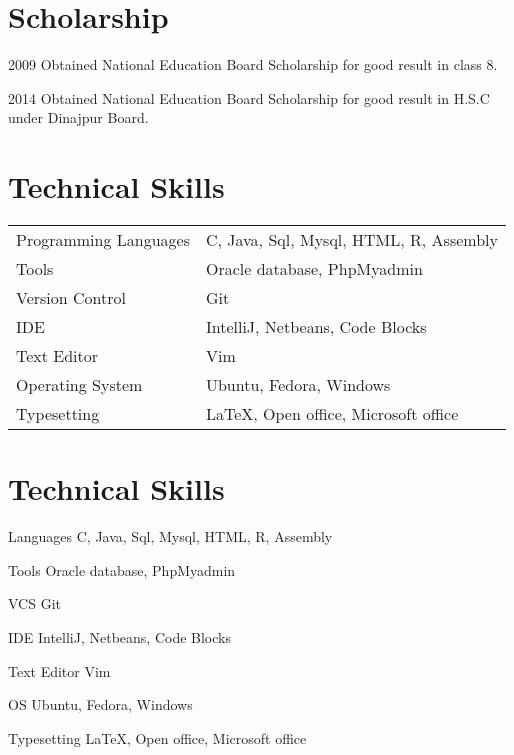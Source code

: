 \documentclass[a4paper]{article}
\begin{document}
\section{Scholarship}

\begin{CV}
\item[2009] Obtained National Education Board Scholarship for good result in class 8.
\item[2014] Obtained National Education Board Scholarship for good result in H.S.C under Dinajpur Board.
\end{CV}

\section{Technical Skills}
\begin{table}[h]
  \begin{tabular}{p{5cm}>{}p{6cm}}
    Programming Languages  & C, Java, Sql, Mysql, HTML, R, Assembly\\
    Tools & Oracle database, PhpMyadmin\\
Version Control  & Git\\
IDE & IntelliJ, Netbeans, Code Blocks\\
Text Editor & Vim\\
Operating System & Ubuntu, Fedora, Windows\\
Typesetting & \LaTeX{}, Open office, Microsoft office\\
\end{tabular}
\end{table}

\section{Technical Skills}

\begin{CV}
\item[Languages]  C, Java, Sql, Mysql, HTML, R, Assembly\\
\item[Tools] Oracle database, PhpMyadmin\\
\item[VCS] Git\\
\item[IDE] IntelliJ, Netbeans, Code Blocks\\
\item[Text Editor] Vim\\
\item[OS] Ubuntu, Fedora, Windows\\
\item[Typesetting] \LaTeX{}, Open office, Microsoft office\\
\end{CV}
\end{document}
